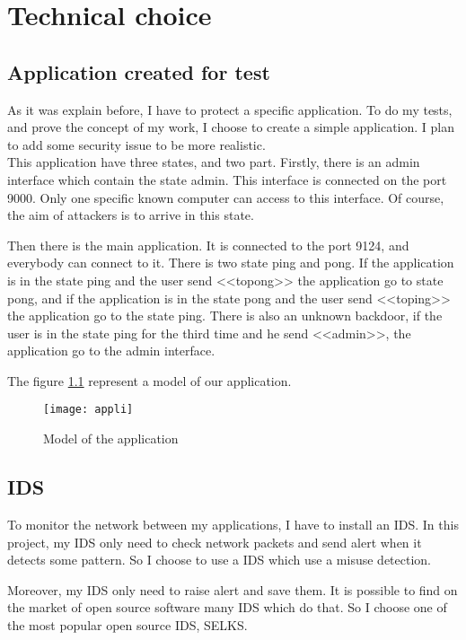 
\chapter{Technical choice}
\label{chap:choice}

\section{Application created for test}

As it was explain before, I have to protect a specific application. To do my tests, and prove the concept of my
work, I choose to create a simple application. I plan to add some security issue to be more realistic.~\\


This application have three states, and two part. Firstly, there is an admin interface which contain the state
admin. This interface is connected on the port 9000. Only one specific known computer can access to this interface.
Of course, the aim of attackers is to arrive in this state.

Then there is the main application. It is connected to the port 9124, and everybody can connect to it. There is two
state ping and pong. If the application is in the state ping and the user send <<topong>> the application go to state
pong, and if the application is in the state pong and the user send <<toping>> the application go to the state ping.
There is also an unknown backdoor, if the user is in the state ping for the third time and he send <<admin>>, the
application go to the admin interface.

The figure \ref{fig:appli} represent a model of our application.


\begin{figure}[!h]
  \centering
  \texttt{[image: appli]}
  \caption{Model of the application}
  \label{fig:appli}
\end{figure}

\section{IDS}

To monitor the network between my applications, I have to install an IDS. In this project, my IDS only need to check
network packets and send alert when it detects some pattern. So I choose to use a IDS which use a misuse detection.

Moreover, my IDS only need to raise alert and save them. It is possible to find on the market of open source
software many IDS which do that. So I choose one of the most popular open source IDS, SELKS.

